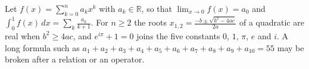 \documentclass{article}
\begin{document}
Let $f(x) = \sum_{k=0}^{n} a_k x^k$ with $a_k \in \mathbb{R}$, so that
$\lim_{x \to 0} f(x) = a_0$ and $\int_0^1 f(x)\,dx = \sum_k \frac{a_k}{k+1}$.
For $n \ge 2$ the roots $x_{1,2} = \frac{-b \pm \sqrt{b^2 - 4ac}}{2a}$ of a
quadratic are real when $b^2 \geq 4ac$, and $e^{i\pi} + 1 = 0$ joins the five
constants $0$, $1$, $\pi$, $e$ and $i$. A long formula such as
$a_1 + a_2 + a_3 + a_4 + a_5 + a_6 + a_7 + a_8 + a_9 + a_{10} = 55$ may be
broken after a relation or an operator.
\end{document}
